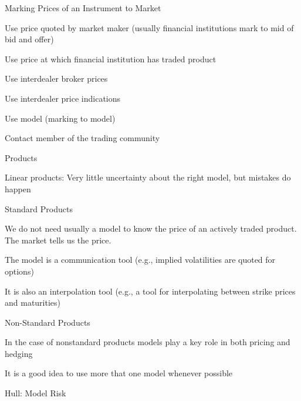 {Marking Prices of an Instrument to Market}






	
Use price quoted by market maker (usually financial institutions mark to mid of bid and offer)


	Use price at which financial institution has traded product


	Use interdealer broker prices


	Use interdealer price indications


	Use model (marking to model)


	Contact member of the trading community





{Products}






	Linear products: Very little uncertainty about the right model, but mistakes do happen


	Standard Products






	We do not need usually a model to know the price of an actively traded product. The market tells us the price.


	The model is a communication tool (e.g., implied volatilities are quoted for options)


	It is also an interpolation tool (e.g., a tool for interpolating between strike prices and maturities)






	Non-Standard Products






	In the case of nonstandard products models play a key role in both pricing and hedging


	It is a good idea to use more that one model whenever possible









{Hull: Model Risk}






